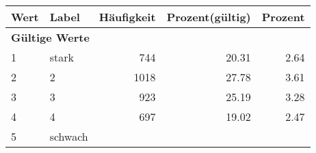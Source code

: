      \begin{longtable}{lXrrr}
     \toprule
     \textbf{Wert} & \textbf{Label} & \textbf{Häufigkeit} & \textbf{Prozent(gültig)} & \textbf{Prozent} \\
     \endhead
     \midrule
     \multicolumn{5}{l}{\textbf{Gültige Werte}}\\

     1 &
     \multicolumn{1}{X}{ stark   } &


       \num{744} &
       \num[round-mode=places,round-precision=2]{20.31} &
         \num[round-mode=places,round-precision=2]{2.64} \\

     2 &
     \multicolumn{1}{X}{ 2   } &


       \num{1018} &
       \num[round-mode=places,round-precision=2]{27.78} &
         \num[round-mode=places,round-precision=2]{3.61} \\

     3 &
     \multicolumn{1}{X}{ 3   } &


       \num{923} &
       \num[round-mode=places,round-precision=2]{25.19} &
         \num[round-mode=places,round-precision=2]{3.28} \\

     4 &
     \multicolumn{1}{X}{ 4   } &


       \num{697} &
       \num[round-mode=places,round-precision=2]{19.02} &
         \num[round-mode=places,round-precision=2]{2.47} \\

     5 &
     \multicolumn{1}{X}{ schwach   } &



\end{longtable}
